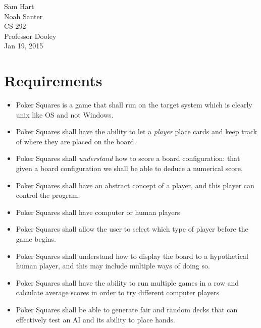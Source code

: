 \documentclass[12pt]{article}
\begin{document}
\noindent Sam Hart \\
Noah Santer \\
CS 292 \\
Professor Dooley \\
Jan 19, 2015 \\

\section{Requirements}

\begin{itemize}
\item Poker Squares is a game that shall run on the target system which is clearly unix like OS and not Windows.
\item Poker Squares shall have the ability to let a \textit{player} place cards and keep track of where they are placed on the board.
\item Poker Squares shall \textit{understand} how to score a board configuration: that given a board configuration we shall be able to deduce a numerical score.
\item Poker Squares shall have an abstract concept of a player, and this player can control the program.
\item Poker Squares shall have computer or human players
\item Poker Squares shall allow the user to select which type of player before the game begins.
\item Poker Squares shall understand how to display the board to a hypothetical human player, and this may include multiple ways of doing so.
\item Poker Squares shall have the ability to run multiple games in a row and calculate average scores in order to try different computer players
\item Poker Squares shall be able to generate fair and random decks that can effectively test an AI and its ability to place hands.
\end{itemize}
\end{document}
